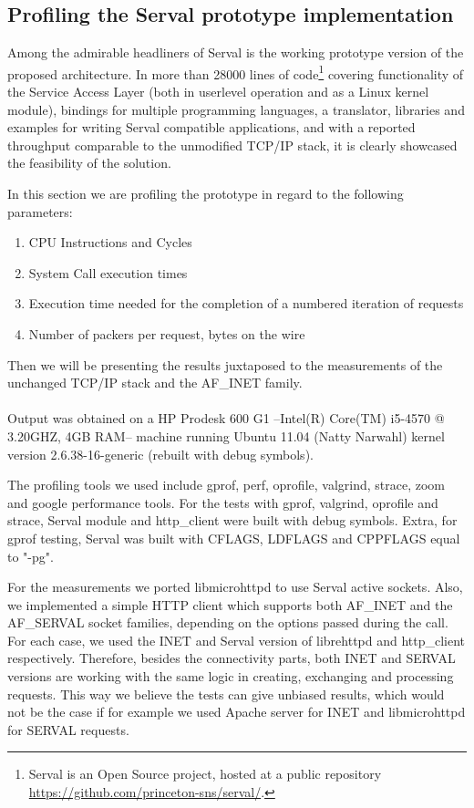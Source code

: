 \newpage
\subsection{Profiling the Serval prototype implementation}
Among the admirable headliners of Serval is the working prototype version of the proposed architecture.
In more than 28000 lines of code\footnote{Serval is an Open Source project, hosted at a public repository\\ \url{https://github.com/princeton-sns/serval/}.} covering functionality of the Service Access Layer (both in userlevel operation and as a Linux kernel module), bindings for multiple programming languages, a translator, libraries and examples for writing Serval compatible applications, and with a reported throughput comparable to the unmodified TCP/IP stack, it is clearly showcased the feasibility of the solution.

In this section we are profiling the prototype in regard to the following parameters:
\begin{enumerate} \itemsep1pt \parskip0pt 
  \item CPU Instructions and Cycles
  \item System Call execution times
  \item Execution time needed for the completion of a numbered iteration of requests
  \item Number of packers per request, bytes on the wire
\end{enumerate}
Then we will be presenting the results juxtaposed to the measurements of the unchanged TCP/IP stack and the AF\_INET family.

\paragraph{} Output was obtained on a HP Prodesk 600 G1 --Intel(R) Core(TM) i5-4570 @ 3.20GHZ, 4GB RAM-- machine running Ubuntu 11.04 (Natty Narwahl) kernel version 2.6.38-16-generic (rebuilt with debug symbols).

The profiling tools we used include gprof, perf, oprofile, valgrind, strace, zoom and google performance tools.
For the tests with gprof, valgrind, oprofile and strace, Serval module and http\_client were built with debug symbols.
Extra, for gprof testing, Serval was built with CFLAGS, LDFLAGS and CPPFLAGS equal to "-pg".

For the measurements we ported libmicrohttpd to use Serval active sockets.
Also, we implemented a simple HTTP client which supports both AF\_INET and the AF\_SERVAL socket families, depending on the options passed during the call.
For each case, we used the INET and Serval version of librehttpd and http\_client respectively.
Therefore, besides the connectivity parts, both INET and SERVAL versions are working with the same logic in creating, exchanging and processing requests.
This way we believe the tests can give unbiased results, which would not be the case if for example we used Apache server for INET and libmicrohttpd for SERVAL requests.

